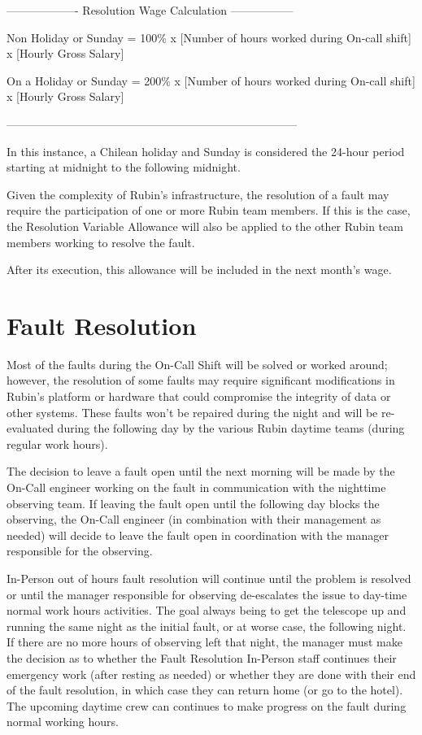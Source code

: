 \begin{center} -------------------  Resolution Wage Calculation ----------------- \end{center}
Non Holiday or Sunday = 100\% x [Number of hours worked during On-call shift] x [Hourly Gross Salary]

\par
On a Holiday or Sunday = 200\% x [Number of hours worked during On-call shift] x [Hourly Gross Salary]
\begin{center} ----------------------------------------------------------------------------- \end{center}


In this instance, a Chilean holiday and Sunday is considered the 24-hour period starting at midnight to the following midnight.

Given the complexity of Rubin's infrastructure, the resolution of a fault may require the participation of one or more Rubin team members. If this is the case, the Resolution Variable Allowance will also be applied to the other Rubin team members working to resolve the fault.

After its execution, this allowance will be included in the next month's wage.


\section{Fault Resolution}

Most of the faults during the On-Call Shift will be solved or worked around; however, the resolution of some faults may require significant modifications in Rubin's platform or hardware that could compromise the integrity of data or other systems. These faults won't be repaired during the night and will be re-evaluated during the following day by the various Rubin daytime teams (during regular work hours).

The decision to leave a fault open until the next morning will be made by the On-Call engineer working on the fault in communication with the nighttime observing team. If leaving the fault open until the following day blocks the observing, the On-Call engineer (in combination with their management as needed) will decide to leave the fault open in coordination with the manager responsible for the observing.

In-Person out of hours fault resolution will continue until the problem is resolved or until the manager responsible for observing de-escalates the issue to day-time normal work hours activities.  The goal always being to get the telescope up and running the same night as the initial fault, or at worse case, the following night.  If there are no more hours of observing left that night, the manager must make the decision as to whether the Fault Resolution In-Person staff continues their emergency work (after resting as needed) or whether they are done with their end of the fault resolution, in which case they can return home (or go to the hotel).  The upcoming daytime crew can continues to make progress on the fault during normal working hours.



